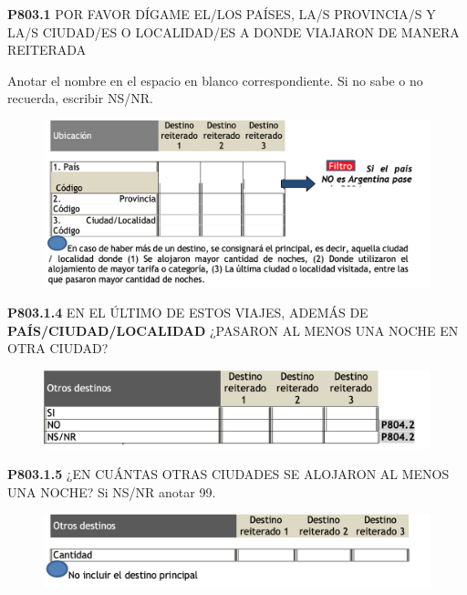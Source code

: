 \documentclass[
  openany]{book}
\begin{document}
\textbf{P803.1} POR FAVOR DÍGAME EL/LOS PAÍSES, LA/S PROVINCIA/S Y LA/S CIUDAD/ES O LOCALIDAD/ES A DONDE VIAJARON DE MANERA REITERADA

Anotar el nombre en el espacio en blanco correspondiente. Si no sabe o no recuerda, escribir NS/NR.

\begin{figure}

{\centering \includegraphics[width=1\linewidth]{imagenes/figura6-255} 

}

\end{figure}

\textbf{P803.1.4} EN EL ÚLTIMO DE ESTOS VIAJES, ADEMÁS DE \textbf{PAÍS/CIUDAD/LOCALIDAD} ¿PASARON AL MENOS UNA NOCHE EN OTRA CIUDAD?

\begin{figure}

{\centering \includegraphics[width=1\linewidth]{imagenes/figura6-256} 

}

\end{figure}

\textbf{P803.1.5} ¿EN CUÁNTAS OTRAS CIUDADES SE ALOJARON AL MENOS UNA NOCHE?
Si NS/NR anotar 99.

\begin{figure}

{\centering \includegraphics[width=1\linewidth]{imagenes/figura6-257} 

}

\end{figure}
\end{document}
